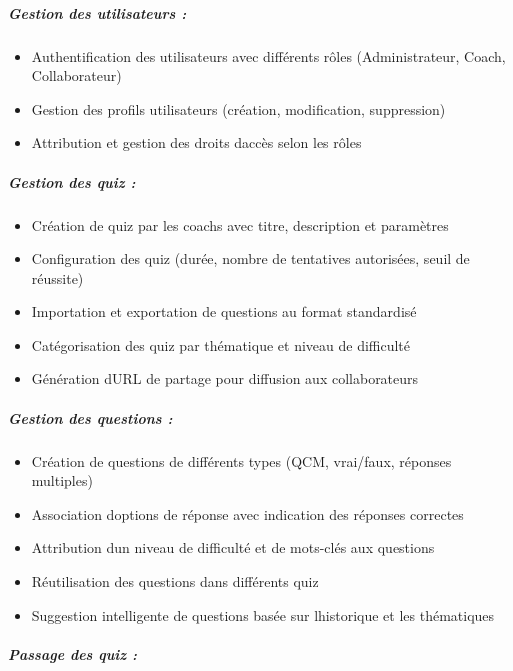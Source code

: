 \documentclass[12pt,a4paper,twoside,openright]{report}
\begin{document}
\hypertarget{gestion-des-utilisateurs}{%
\subparagraph{Gestion des utilisateurs
:}\label{gestion-des-utilisateurs}}

\begin{itemize}
\item
  Authentification des utilisateurs avec différents rôles
  (Administrateur, Coach, Collaborateur)
\item
  Gestion des profils utilisateurs (création, modification, suppression)
\item
  Attribution et gestion des droits d\textquotesingle accès selon les
  rôles
\end{itemize}

\hypertarget{gestion-des-quiz}{%
\subparagraph{Gestion des quiz :}\label{gestion-des-quiz}}

\begin{itemize}
\item
  Création de quiz par les coachs avec titre, description et paramètres
\item
  Configuration des quiz (durée, nombre de tentatives autorisées, seuil
  de réussite)
\item
  Importation et exportation de questions au format standardisé
\item
  Catégorisation des quiz par thématique et niveau de difficulté
\item
  Génération d\textquotesingle URL de partage pour diffusion aux
  collaborateurs
\end{itemize}

\hypertarget{gestion-des-questions}{%
\subparagraph{Gestion des questions :}\label{gestion-des-questions}}

\begin{itemize}
\item
  Création de questions de différents types (QCM, vrai/faux, réponses
  multiples)
\item
  Association d\textquotesingle options de réponse avec indication des
  réponses correctes
\item
  Attribution d\textquotesingle un niveau de difficulté et de mots-clés
  aux questions
\item
  Réutilisation des questions dans différents quiz
\item
  Suggestion intelligente de questions basée sur
  l\textquotesingle historique et les thématiques
\end{itemize}

\hypertarget{passage-des-quiz}{%
\subparagraph{Passage des quiz :}\label{passage-des-quiz}}
\end{document}
